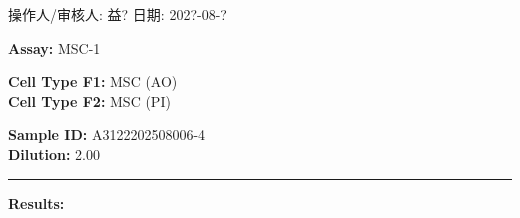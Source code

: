 \documentclass[UTF8,10pt,a4paper,fontset=fandol]{ctexart}
\newcommand{\fieldvalue}[1]{#1}
\newcommand{\handwritten}[1]{#1}
\begin{document}
\bigskip

\noindent
\begin{minipage}[t]{0.47\linewidth}
\centering
\end{minipage}
\hfill
\begin{minipage}[t]{0.47\linewidth}
\centering
\end{minipage}

\medskip

\noindent
\begin{minipage}[t]{0.47\linewidth}
\centering
\end{minipage}
\hfill
\begin{minipage}[t]{0.47\linewidth}
\centering
\end{minipage}

\vfill

\noindent 操作人/审核人:
\fieldvalue{\handwritten{益?}}
\hfill
日期:
\fieldvalue{\handwritten{202?-08-?}}

\newpage

\noindent\textbf{Assay:} MSC-1

\medskip

\noindent\textbf{Cell Type F1:} MSC (AO)\\
\textbf{Cell Type F2:} MSC (PI)

\medskip

\noindent\textbf{Sample ID:} A3122202508006-4\\
\textbf{Dilution:} 2.00

\medskip
\noindent\rule{\linewidth}{0.4pt}

\noindent\textbf{Results:}
\end{document}
